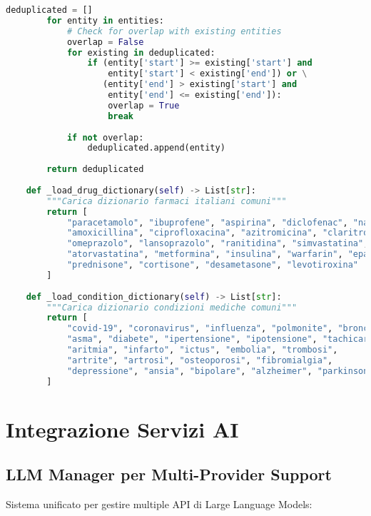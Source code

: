 \documentclass[12pt,a4paper]{report}
\begin{document}
\begin{lstlisting}[language=Python, caption=Medical Entity Extractor]
        deduplicated = []
        for entity in entities:
            # Check for overlap with existing entities
            overlap = False
            for existing in deduplicated:
                if (entity['start'] >= existing['start'] and 
                    entity['start'] < existing['end']) or \
                   (entity['end'] > existing['start'] and 
                    entity['end'] <= existing['end']):
                    overlap = True
                    break
            
            if not overlap:
                deduplicated.append(entity)
        
        return deduplicated
    
    def _load_drug_dictionary(self) -> List[str]:
        """Carica dizionario farmaci italiani comuni"""
        return [
            "paracetamolo", "ibuprofene", "aspirina", "diclofenac", "naprossene",
            "amoxicillina", "ciprofloxacina", "azitromicina", "claritromicina",
            "omeprazolo", "lansoprazolo", "ranitidina", "simvastatina",
            "atorvastatina", "metformina", "insulina", "warfarin", "eparina",
            "prednisone", "cortisone", "desametasone", "levotiroxina"
        ]
    
    def _load_condition_dictionary(self) -> List[str]:
        """Carica dizionario condizioni mediche comuni"""
        return [
            "covid-19", "coronavirus", "influenza", "polmonite", "bronchite",
            "asma", "diabete", "ipertensione", "ipotensione", "tachicardia",
            "aritmia", "infarto", "ictus", "embolia", "trombosi",
            "artrite", "artrosi", "osteoporosi", "fibromialgia",
            "depressione", "ansia", "bipolare", "alzheimer", "parkinson"
        ]
\end{lstlisting}

\section{Integrazione Servizi AI}

\subsection{LLM Manager per Multi-Provider Support}

Sistema unificato per gestire multiple API di Large Language Models:
\end{document}

